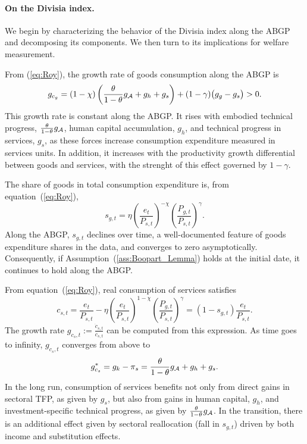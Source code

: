 \documentclass[12pt,a4paper]{article}
\def\equiv{:=}  %
\begin{document}
\paragraph{On the Divisia index.}
We begin by characterizing the behavior of the Divisia index along the ABGP and decomposing its components. We then turn to its implications for welfare measurement.

\noindent From (\ref{eq:Roy}), the growth rate of goods consumption along the ABGP is 
\begin{equation}\label{eq:gcg}
g_{c_g} = (1-\chi)\left(\frac{\theta}{1-\theta} g_{\cal A} + g_h + g_s \right) + (1-\gamma) \big( g_g -  g_s \big) > 0 .
\end{equation}
This growth rate is constant along the ABGP. It rises 
with embodied technical progress, \( \frac{\theta}{1-\theta} g_{\cal A}\), human capital accumulation, \( g_h \), and technical progress in services, \( g_s \), as these forces increase consumption expenditure measured in services units. In addition, it increases with the productivity growth differential between goods and services, with the strenght of this effect governed by \( 1- \gamma \).

The share of goods in total consumption expenditure is, from equation~(\ref{eq:Roy}),
\[
s_{g,t} = \eta \left( \frac{e_t}{P_{s,t}} \right)^{-\chi} \left( \frac{P_{g,t}}{P_{s,t}} \right)^\gamma.
\]
Along the ABGP, \( s_{g,t} \) declines over time, a well-documented feature of goods expenditure shares in the data, and converges to zero asymptotically. Consequently, if Assumption~(\ref{ass:Boopart_Lemma}) holds at the initial date, it continues to hold along the ABGP.

From equation~(\ref{eq:Roy}), real consumption of services satisfies
\[ %
c_{s,t} = \frac{e_t}{P_{s,t}} - \eta \left( \frac{e_t}{P_{s,t}} \right)^{1 - \chi} \left( \frac{P_{g,t}}{P_{s,t}} \right)^{\gamma} 
= \left(1-s_{g,t} \right) \frac{e_t}{P_{s,t}}.
\]
The growth rate \( g_{c_s,t} \equiv \frac{\dot{c}_{s,t}}{c_{s,t}} \) can be computed from this expression.  As time goes to infinity, $g_{c_s,t}$ converges from above to 
\begin{equation}\label{eq:gcs}
g^*_{c_s} =
g_k - \pi_s = \frac{\theta}{1-\theta}g_{\cal A} + g_h + g_s .
\end{equation}
In the long run, consumption of services benefits not only from direct gains in sectoral TFP, as given by $g_s$, but also from gains in human capital, $g_h$, and investment-specific technical progress, as given by \( \frac{\theta}{1-\theta}g_{\cal A} \). In the transition, there is an additional effect given by sectoral reallocation (fall in $s_{g,t}$) driven by both income and substitution effects.
\end{document}
